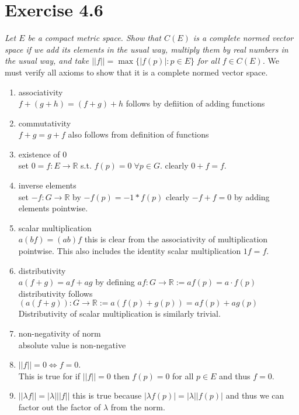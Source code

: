 \documentclass{amsart}
\begin{document}
    \section{Exercise  4.6}
    \emph{Let $E$ be a compact metric space. Show that $C(E)$ is a complete normed
        vector space if we add its elements in the usual way, multiply them by real numbers in the 
    usual way, and take $||f|| = \max\{|f(p)| : p \in E\}$ for all $f \in C(E)$.}
    We must verify all axioms to show that it is a complete normed vector space.
    \begin{enumerate}
        \item associativity\\
            $f + (g + h) = (f + g) + h$ 
            follows by defiition of adding functions
        \item commutativity\\
            $f + g = g + f$
            also follows from definition of functions
        \item existence of $0$\\ 
            set $0 = f : E \rightarrow \mathbb{R} $ s.t. $f(p) = 0 \; \forall p \in G$.
            clearly $0 + f = f$.
        \item inverse elements\\
            set $-f : G \rightarrow \mathbb{R} $ by $-f(p) = -1 * f(p)$
            clearly  $-f + f = 0$ by adding elements pointwise.
        \item  scalar multiplication\\
            $a(bf) = (ab)f$ this is clear from the associativity of multiplication pointwise.
            This also includes the identity scalar multiplication $1f = f$.
        \item distributivity\\
            $a(f+g) = af + ag$ by defining $af : G \rightarrow \mathbb{R} := af(p) = a \cdot f(p)$ 
            distributivity follows $(a(f+g)) : G \rightarrow \mathbb{R} := a(f(p) + g(p)) = af(p) + ag(p)$ 
            Distributivity of scalar multiplication is similarly trivial.
        \item non-negativity of norm\\
            absolute value is non-negative
        \item $||f|| = 0 \Leftrightarrow f = 0$.\\
            This is true for if $||f|| = 0$ then $f(p) = 0$ for all $p \in E$ and thus $f = 0$.
        \item $||\lambda f|| = |\lambda| ||f||$ this is true because $|\lambda f(p)| = |\lambda| |f(p)|$ and thus we can factor out the factor of $\lambda$ from the norm.

\end{enumerate}
\end{document}
